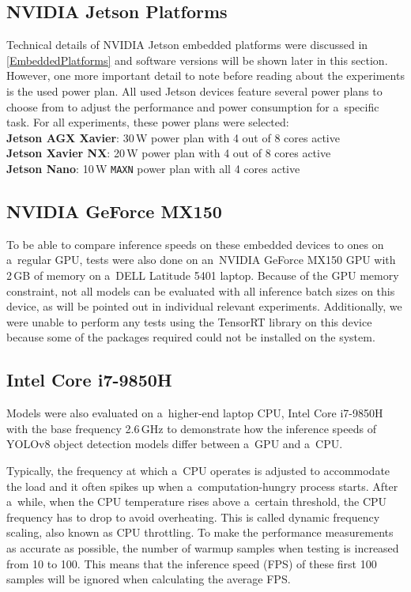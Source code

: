 \subsection{NVIDIA Jetson Platforms}

Technical details of NVIDIA Jetson embedded platforms were discussed in
\autoref{EmbeddedPlatforms} and software versions will be shown later in this section.
However, one more important detail to note before reading about the experiments
is the used power plan. All used Jetson devices feature several power plans to
choose from to adjust the performance and power consumption for a~specific task.
For all experiments, these power plans were selected: \\
\textbf{Jetson AGX Xavier}: 30\,W power plan with 4 out of 8 cores active \\
\textbf{Jetson Xavier NX}: 20\,W power plan with 4 out of 8 cores active \\
\textbf{Jetson Nano}: 10\,W \texttt{MAXN} power plan with all 4 cores active


\subsection{NVIDIA GeForce MX150}

To be able to compare inference speeds on these embedded devices to ones on
a~regular GPU, tests were also done on an~NVIDIA GeForce MX150 GPU with 2\,GB of
memory on a~DELL Latitude 5401 laptop. Because of the GPU memory constraint, not
all models can be evaluated with all inference batch sizes on this device, as
will be pointed out in individual relevant experiments. Additionally, we were
unable to perform any tests using the TensorRT library on this device because
some of the packages required could not be installed on the system.


\subsection{Intel Core i7-9850H}

Models were also evaluated on a~higher-end laptop CPU, Intel Core i7-9850H with
the base frequency 2.6\,GHz to demonstrate how the inference speeds of YOLOv8
object detection models differ between a~GPU and a~CPU.

Typically, the frequency at which a~CPU operates is adjusted to accommodate the
load and it often spikes up when a~computation-hungry process starts. After
a~while, when the CPU temperature rises above a~certain threshold, the CPU
frequency has to drop to avoid overheating. This is called dynamic frequency
scaling, also known as CPU throttling. To make the performance measurements as
accurate as possible, the number of warmup samples when testing is increased
from 10 to 100. This means that the inference speed (FPS) of these first 100
samples will be ignored when calculating the average FPS.

